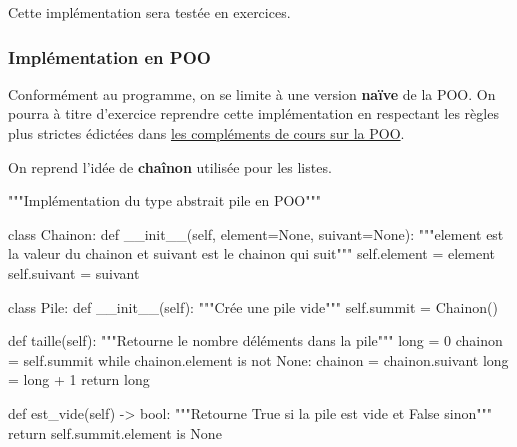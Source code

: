 \documentclass[
  a4paper,
  DIV=11,
  numbers=noendperiod]{scrartcl}
\newenvironment{Shaded}{\begin{snugshade}}{\end{snugshade}}
\newcommand{\BuiltInTok}[1]{\textcolor[rgb]{0.00,0.23,0.31}{#1}}
\newcommand{\CommentTok}[1]{\textcolor[rgb]{0.37,0.37,0.37}{#1}}
\newcommand{\ControlFlowTok}[1]{\textcolor[rgb]{0.00,0.23,0.31}{#1}}
\newcommand{\DecValTok}[1]{\textcolor[rgb]{0.68,0.00,0.00}{#1}}
\newcommand{\FunctionTok}[1]{\textcolor[rgb]{0.28,0.35,0.67}{#1}}
\newcommand{\KeywordTok}[1]{\textcolor[rgb]{0.00,0.23,0.31}{#1}}
\newcommand{\NormalTok}[1]{\textcolor[rgb]{0.00,0.23,0.31}{#1}}
\newcommand{\OperatorTok}[1]{\textcolor[rgb]{0.37,0.37,0.37}{#1}}
\newcommand{\VariableTok}[1]{\textcolor[rgb]{0.07,0.07,0.07}{#1}}
\begin{document}
Cette implémentation sera testée en exercices.

\hypertarget{impluxe9mentation-en-poo}{%
\subsubsection{Implémentation en POO}\label{impluxe9mentation-en-poo}}

Conformément au programme, on se limite à une version \textbf{naïve} de
la POO. On pourra à titre d'exercice reprendre cette implémentation en
respectant les règles plus strictes édictées dans
\href{../langagesProgr/POO_complements.qmd}{les compléments de cours sur
la POO}.

On reprend l'idée de \textbf{chaînon} utilisée pour les listes.

\begin{Shaded}
\begin{Highlighting}[]
\CommentTok{"""Implémentation du type abstrait pile en POO"""}


\KeywordTok{class}\NormalTok{ Chainon:}
    \KeywordTok{def} \FunctionTok{\_\_init\_\_}\NormalTok{(}\VariableTok{self}\NormalTok{, element}\OperatorTok{=}\VariableTok{None}\NormalTok{, suivant}\OperatorTok{=}\VariableTok{None}\NormalTok{):}
        \CommentTok{"""element est la valeur du chainon et suivant est le chainon qui suit"""}
        \VariableTok{self}\NormalTok{.element }\OperatorTok{=}\NormalTok{ element}
        \VariableTok{self}\NormalTok{.suivant }\OperatorTok{=}\NormalTok{ suivant}


\KeywordTok{class}\NormalTok{ Pile:}
    \KeywordTok{def} \FunctionTok{\_\_init\_\_}\NormalTok{(}\VariableTok{self}\NormalTok{):}
        \CommentTok{"""Crée une pile vide"""}
        \VariableTok{self}\NormalTok{.summit }\OperatorTok{=}\NormalTok{ Chainon()}

    \KeywordTok{def}\NormalTok{ taille(}\VariableTok{self}\NormalTok{):}
        \CommentTok{"""Retourne le nombre d\textquotesingle{}éléments dans la pile"""}
        \BuiltInTok{long} \OperatorTok{=} \DecValTok{0}
\NormalTok{        chainon }\OperatorTok{=} \VariableTok{self}\NormalTok{.summit}
        \ControlFlowTok{while}\NormalTok{ chainon.element }\KeywordTok{is} \KeywordTok{not} \VariableTok{None}\NormalTok{:}
\NormalTok{            chainon }\OperatorTok{=}\NormalTok{ chainon.suivant}
            \BuiltInTok{long} \OperatorTok{=} \BuiltInTok{long} \OperatorTok{+} \DecValTok{1}
        \ControlFlowTok{return} \BuiltInTok{long}

    \KeywordTok{def}\NormalTok{ est\_vide(}\VariableTok{self}\NormalTok{) }\OperatorTok{{-}\textgreater{}} \BuiltInTok{bool}\NormalTok{:}
        \CommentTok{"""Retourne True si la pile est vide et False sinon"""}
        \ControlFlowTok{return} \VariableTok{self}\NormalTok{.summit.element }\KeywordTok{is} \VariableTok{None}


\end{Highlighting}
\end{Shaded}
\end{document}
